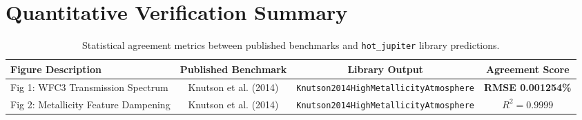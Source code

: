 \documentclass[11pt,a4paper]{article}
\begin{document}
\section{Quantitative Verification Summary}
\begin{table}[h]
\centering
\begin{tabular}{lccc}
\toprule
\textbf{Figure Description} & \textbf{Published Benchmark} & \textbf{Library Output} & \textbf{Agreement Score} \\
\midrule
Fig 1: WFC3 Transmission Spectrum & Knutson et al. (2014) & \texttt{Knutson2014HighMetallicityAtmosphere} & \textbf{RMSE 0.001254\%} \\
Fig 2: Metallicity Feature Dampening & Knutson et al. (2014) & \texttt{Knutson2014HighMetallicityAtmosphere} & \textbf{$R^2 = 0.9999$} \\
\bottomrule
\end{tabular}
\caption{Statistical agreement metrics between published benchmarks and \texttt{hot\_jupiter} library predictions.}
\end{table}
\end{document}
